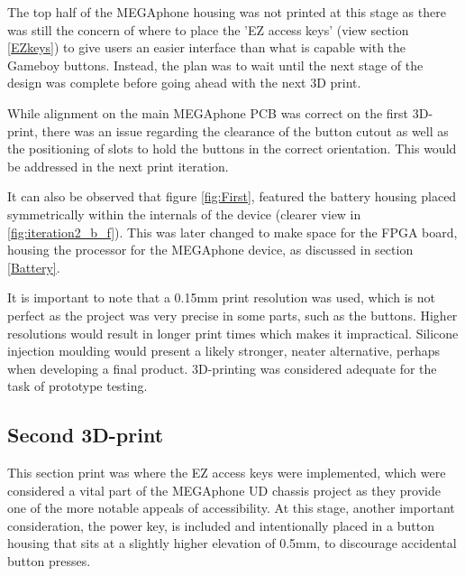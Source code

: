 The top half of the MEGAphone housing was not printed at this stage as there was still the concern of where to place the 'EZ access keys' (view section \ref{EZkeys}) to give users an easier interface than what is capable with the Gameboy buttons.
Instead, the plan was to wait until the next stage of the design was complete before going ahead with the next 3D print.

While alignment on the main MEGAphone PCB was correct on the first 3D-print, there was an issue regarding the clearance of the button cutout as well as the positioning of slots to hold the buttons in the correct orientation.
This would be addressed in the next print iteration.

It can also be observed that figure \ref{fig:First}, featured the battery housing placed symmetrically within the internals of the device (clearer view in \ref{fig:iteration2_b_f}).
This was later changed to make space for the FPGA board, housing the processor for the MEGAphone device, as discussed in section \ref{Battery}.

It is important to note that a 0.15mm print resolution was used, which is not perfect as the project was very precise in some parts, such as the buttons.
Higher resolutions would result in longer print times which makes it impractical.
Silicone injection moulding would present a likely stronger, neater alternative, perhaps when developing a final product.
3D-printing was considered adequate for the task of prototype testing.

\subsection{Second 3D-print} \label{Second Print}

This section print was where the EZ access keys were implemented, which were considered a vital part of the MEGAphone UD chassis project as they provide one of the more notable appeals of accessibility.
At this stage, another important consideration, the power key, is included and intentionally placed in a button housing that sits at a slightly higher elevation of 0.5mm, to discourage accidental button presses.

